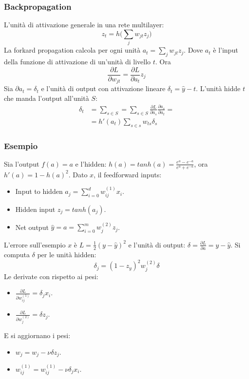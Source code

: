 		\subsubsection{Backpropagation}
		L'unit\`a di attivazione generale in una rete multilayer:
		$$z_t = h\bigl(\sum\limits_jw_{jt}z_j\bigr)$$
		La forkard propagation calcola per ogni unit\`a $a_t = \sum\limits_j w_{jt}z_j$.
		Dove $a_t$ \`e l'input della funzione di attivazione di un'unit\`a di livello $t$.
		Ora
		$$\frac{\partial L}{\partial w_{jt}} = \frac{\partial L}{\partial a_t}z_j$$
		Sia $\partial a_t = \delta_t$ e l'unit\`a di output con attivazione lineare $\delta_t = \hat{y} -t$.
		L'unit\`a hidde $t$ che manda l'output all'unit\`a $S$:
		\begin{align*}
			\delta_t &= \sum\limits_{s\in S} = \sum\limits_{s\in S}\frac{\partial L}{\partial a_s}\frac{\partial a_s}{\partial a_t}=\\
			&= h'(a_t)\sum\limits_{s\in s} w_{ts}\delta_s
		\end{align*}

		\subsubsection{Esempio}
		Sia l'output $f(a) = a$ e l'hidden: $h(a) = tanh(a) = \frac{e^a-e^{-a}}{e^a+e^{-a}}$, ora $h'(a) = 1-h(a)^2$.
		Dato $x$, il feedforward inputs:
		\begin{multicols}{2}
			\begin{itemize}
				\item Input to hidden $a_j = \sum\limits_{i = 0}^d w_{ij}^{(1)}x_i$.
				\item Hidden input $z_j = tanh(a_j)$.
				\item Net output $\hat{y} = a = \sum\limits_{i = 0}^m w_j^{(2)} z_j$.
			\end{itemize}
		\end{multicols}
		L'errore sull'esempio $x$ \`e $L= \frac{1}{2}(y-\hat{y})^2$ e l'unit\`a di output: $\delta = \frac{\partial L}{\partial a} = y - \hat{y}$.
		Si computa $\delta$ per le unit\`a hidden:
		$$\delta_j = (1-z_y)^2w_j^{(2)}\delta$$
		Le derivate con rispetto ai pesi:
		\begin{multicols}{2}
			\begin{itemize}
				\item $\frac{\partial L}{\partial w_{ij}^{(1)}} = \delta_jx_i$.
				\item $\frac{\partial L}{\partial w_j^{(2)}} = \delta z_j$.
			\end{itemize}
		\end{multicols}
		E si aggiornano i pesi:
		\begin{multicols}{2}
			\begin{itemize}
				\item $w_j = w_j - \nu \delta z_j$.
				\item $w_{ij}^{(1)} = w_{ij}^{(1)} - \nu \delta_jx_i$.
			\end{itemize}
		\end{multicols}


